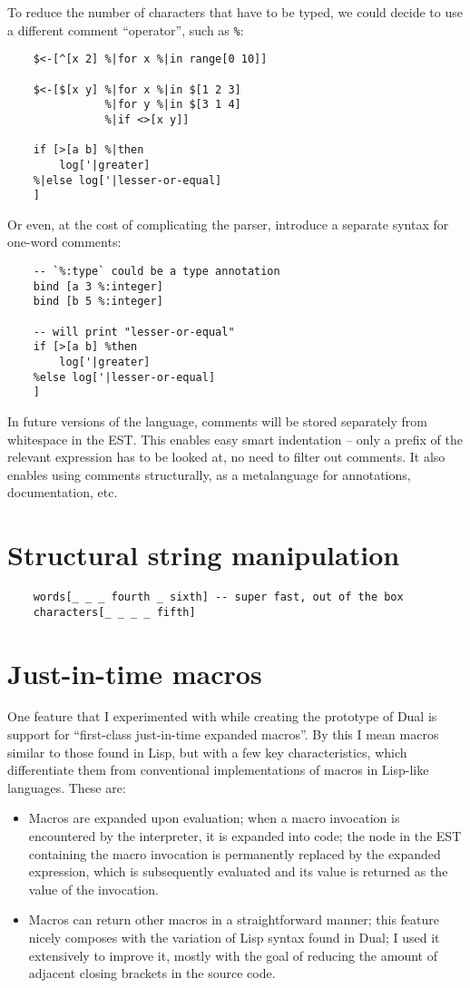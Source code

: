 To reduce the number of characters that have to be typed, we could decide to use a different comment ``operator'', such as \texttt{\%}:
\begin{lstlisting}
    $<-[^[x 2] %|for x %|in range[0 10]]
    
    $<-[$[x y] %|for x %|in $[1 2 3]
               %|for y %|in $[3 1 4]
               %|if <>[x y]]

    if [>[a b] %|then
        log['|greater]
    %|else log['|lesser-or-equal]
    ]
\end{lstlisting}

Or even, at the cost of complicating the parser, introduce a separate syntax for one-word comments:
\begin{lstlisting}
    -- `%:type` could be a type annotation 
    bind [a 3 %:integer]
    bind [b 5 %:integer]

    -- will print "lesser-or-equal"
    if [>[a b] %then
        log['|greater]
    %else log['|lesser-or-equal]
    ]
\end{lstlisting}

In future versions of the language, comments will be stored separately from whitespace in the EST. This enables easy smart indentation -- only a prefix of the relevant expression has to be looked at, no need to filter out comments. It also enables using comments structurally, as a metalanguage for annotations, documentation, etc.

\section{Structural string manipulation}
\begin{lstlisting}
    words[_ _ _ fourth _ sixth] -- super fast, out of the box
    characters[_ _ _ _ fifth]
\end{lstlisting}

\section{Just-in-time macros}
One feature that I experimented with while creating the prototype of Dual is support for ``first-class just-in-time expanded macros''. By this I mean macros similar to those found in Lisp, but with a few key characteristics, which differentiate them from conventional implementations of macros in Lisp-like languages. These are:
\begin{itemize}
	\item Macros are expanded upon evaluation; when a macro invocation is encountered by the interpreter, it is expanded into code; the node in the EST containing the macro invocation is permanently replaced by the expanded expression, which is subsequently evaluated and its value is returned as the value of the invocation.
	\item Macros can return other macros in a straightforward manner; this feature nicely composes with the variation of Lisp syntax found in Dual; I used it extensively to improve it, mostly with the goal of reducing the amount of adjacent closing brackets in the source code.
\end{itemize}

